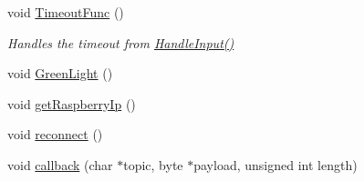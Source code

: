 \begin{DoxyCompactItemize}
void \mbox{\hyperlink{_hodoor_8ino_a419e6b0415908250d60da1a336370405}{Timeout\+Func}} ()
\begin{DoxyCompactList}\small\item\em Handles the timeout from \mbox{\hyperlink{_hodoor_8ino_a98675754ce81a9e1a94fa2835d88d9d3}{Handle\+Input()}} \end{DoxyCompactList}\item 
void \mbox{\hyperlink{_hodoor_8ino_a053826d2d5448727c8fa26fc929e0747}{Green\+Light}} ()
\item 
void \mbox{\hyperlink{_hodoor_8ino_a7a69432900bad935bd00eb0a9d4bf61f}{get\+Raspberry\+Ip}} ()
\item 
void \mbox{\hyperlink{_hodoor_8ino_a4bcd6ce7d04c38f8c4ff908d1fc50f86}{reconnect}} ()
\item 
void \mbox{\hyperlink{_hodoor_8ino_ac3a129f66dc859e2b7279565f4e1de78}{callback}} (char $\ast$topic, byte $\ast$payload, unsigned int length)
\end{DoxyCompactItemize}
